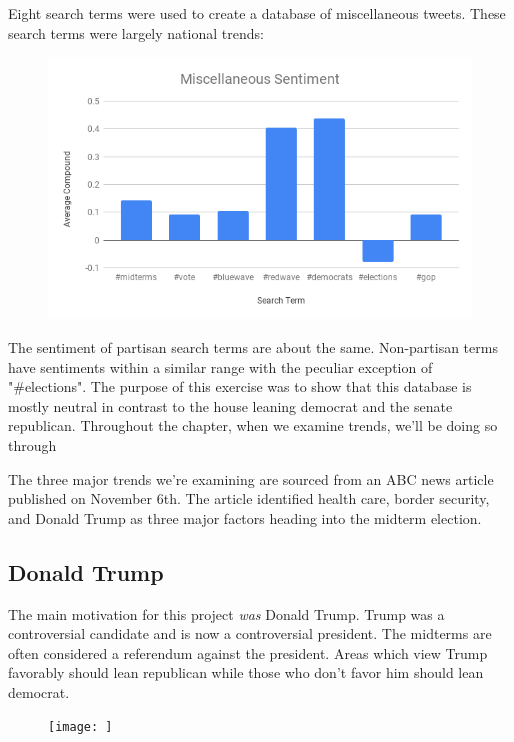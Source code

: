 \documentclass[11pt, twoside, reqno]{article}
\begin{document}
Eight search terms were used to create a database of miscellaneous tweets. These search terms were largely national trends:

\begin{figure}[H]
	\includegraphics[scale=0.5]{misc_sent}
\end{figure}

The sentiment of partisan search terms are about the same. Non-partisan terms have sentiments within a similar range with the peculiar exception of "\#elections". The purpose of this exercise was to show that this database is mostly neutral in contrast to the house leaning democrat and the senate republican. Throughout the chapter, when we examine trends, we'll be doing so through 

The three major trends we're examining are sourced from an ABC news article published on November 6th. The article identified health care, border security, and Donald Trump as three major factors heading into the midterm election. 

\subsection{Donald Trump}
The main motivation for this project \textit{was} Donald Trump. Trump was a controversial candidate and is now a controversial president. The midterms are often considered a referendum against the president. Areas which view Trump favorably should lean republican while those who don't favor him should lean democrat.

\begin{figure}
	\texttt{[image: ]}	
\end{figure}
\end{document}

